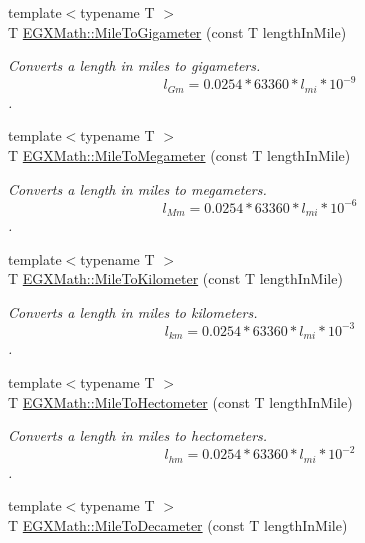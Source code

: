 \begin{DoxyCompactItemize}
{\footnotesize template$<$typename T $>$ }\\T \mbox{\hyperlink{group___e_g_x_math-_conversions-_length_conversions-_imperial-_mile-_s_i_gac8c76e568a7a7f5c544b70808d85c61b}{E\+G\+X\+Math\+::\+Mile\+To\+Gigameter}} (const T length\+In\+Mile)
\begin{DoxyCompactList}\small\item\em Converts a length in miles to gigameters. \[ l_{Gm}=0.0254 * 63360 * l_{mi} * 10^{-9} \]. \end{DoxyCompactList}\item 
{\footnotesize template$<$typename T $>$ }\\T \mbox{\hyperlink{group___e_g_x_math-_conversions-_length_conversions-_imperial-_mile-_s_i_ga3b369ccb3f0fc38098abdba01110910b}{E\+G\+X\+Math\+::\+Mile\+To\+Megameter}} (const T length\+In\+Mile)
\begin{DoxyCompactList}\small\item\em Converts a length in miles to megameters. \[ l_{Mm}=0.0254 * 63360 * l_{mi} * 10^{-6} \]. \end{DoxyCompactList}\item 
{\footnotesize template$<$typename T $>$ }\\T \mbox{\hyperlink{group___e_g_x_math-_conversions-_length_conversions-_imperial-_mile-_s_i_ga426c0a7ef1e87648941729c5447f0b07}{E\+G\+X\+Math\+::\+Mile\+To\+Kilometer}} (const T length\+In\+Mile)
\begin{DoxyCompactList}\small\item\em Converts a length in miles to kilometers. \[ l_{km}=0.0254 * 63360 * l_{mi} * 10^{-3} \]. \end{DoxyCompactList}\item 
{\footnotesize template$<$typename T $>$ }\\T \mbox{\hyperlink{group___e_g_x_math-_conversions-_length_conversions-_imperial-_mile-_s_i_ga34d371b17e63e2ed83787eab65b8dab9}{E\+G\+X\+Math\+::\+Mile\+To\+Hectometer}} (const T length\+In\+Mile)
\begin{DoxyCompactList}\small\item\em Converts a length in miles to hectometers. \[ l_{hm}=0.0254 * 63360 * l_{mi} * 10^{-2} \]. \end{DoxyCompactList}\item 
{\footnotesize template$<$typename T $>$ }\\T \mbox{\hyperlink{group___e_g_x_math-_conversions-_length_conversions-_imperial-_mile-_s_i_ga2f8705f9f0e67cce6a4e19c54ea907b0}{E\+G\+X\+Math\+::\+Mile\+To\+Decameter}} (const T length\+In\+Mile)

\end{DoxyCompactItemize}
